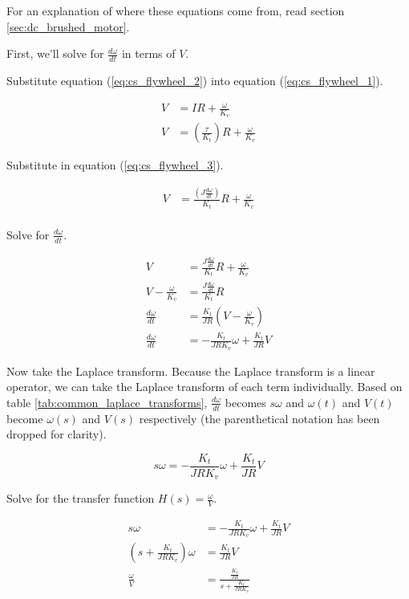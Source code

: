 For an explanation of where these equations come from, read section
\ref{sec:dc_brushed_motor}.

First, we'll solve for $\frac{d\omega}{dt}$ in terms of $V$.

Substitute equation (\ref{eq:cs_flywheel_2}) into equation
(\ref{eq:cs_flywheel_1}).

\begin{align*}
  V &= IR + \frac{\omega}{K_v} \\
  V &= \left(\frac{\tau}{K_t}\right) R + \frac{\omega}{K_v}
\end{align*}

Substitute in equation (\ref{eq:cs_flywheel_3}).

\begin{align*}
  V &= \frac{\left(J \frac{d\omega}{dt}\right)}{K_t} R + \frac{\omega}{K_v} \\
\end{align*}

Solve for $\frac{d\omega}{dt}$.

\begin{align*}
  V &= \frac{J \frac{d\omega}{dt}}{K_t} R + \frac{\omega}{K_v} \\
  V - \frac{\omega}{K_v} &= \frac{J \frac{d\omega}{dt}}{K_t} R \\
  \frac{d\omega}{dt} &= \frac{K_t}{JR} \left(V - \frac{\omega}{K_v}\right) \\
  \frac{d\omega}{dt} &= -\frac{K_t}{JRK_v} \omega + \frac{K_t}{JR} V
\end{align*}

Now take the Laplace transform. Because the Laplace transform is a linear
operator, we can take the Laplace transform of each term individually. Based on
table \ref{tab:common_laplace_transforms}, $\frac{d\omega}{dt}$ becomes
$s\omega$ and $\omega(t)$ and $V(t)$ become $\omega(s)$ and $V(s)$ respectively
(the parenthetical notation has been dropped for clarity).

\begin{equation}
  s \omega = -\frac{K_t}{JRK_v} \omega + \frac{K_t}{JR} V
  \label{eq:cs_motor_tf}
\end{equation}

Solve for the transfer function $H(s) = \frac{\omega}{V}$.

\begin{align*}
  s \omega &= -\frac{K_t}{JRK_v} \omega + \frac{K_t}{JR} V \\
  \left(s + \frac{K_t}{JRK_v}\right) \omega &= \frac{K_t}{JR} V \\
  \frac{\omega}{V} &= \frac{\frac{K_t}{JR}}{s + \frac{K_t}{JRK_v}} \\
\end{align*}

